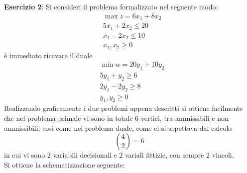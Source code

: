 \documentclass[a4paper]{extarticle}
\begin{document}
\vspace{1em}
\noindent
\textbf{Esercizio 2}: Si consideri il problema formalizzato nel seguente modo:
\begin{align*}
    &\max z = 6x_1 + 8x_2\\
    &5x_1 + 2x_2 \leq 20\\
    &x_1 - 2x_2 \leq 10\\
    &x_1,x_2 \geq 0
\end{align*}
è immediato ricavare il duale
\begin{align*}
    &\min w = 20y_1 + 10y_2\\
    &5y_1 + y_2 \geq 6\\
    &2y_1 - 2y_2 \geq 8\\
    &y_1,y_2 \geq 0
\end{align*}
Realizzando graficamente i due problemi appena descritti si ottiene facilmente che nel problema primale vi sono in totale $6$ vertici, tra ammissibili e non ammissibili, così come nel problema duale, come ci si aspettava dal calcolo
\[\binom{4}{2}=6\]
in cui vi sono $2$ variabili decisionali e $2$ variali fittizie, con sempre $2$ vincoli.\\
Si ottiene la schematizzazione seguente:
\end{document}
